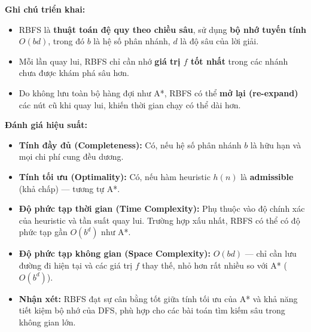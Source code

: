\textbf{Ghi chú triển khai:}
\begin{itemize}
    \item RBFS là \textbf{thuật toán đệ quy theo chiều sâu}, sử dụng \textbf{bộ nhớ tuyến tính $O(bd)$}, 
    trong đó $b$ là hệ số phân nhánh, $d$ là độ sâu của lời giải.
    \item Mỗi lần quay lui, RBFS chỉ cần nhớ \textbf{giá trị $f$ tốt nhất} trong các nhánh chưa được khám phá sâu hơn.
    \item Do không lưu toàn bộ hàng đợi như A*, RBFS có thể \textbf{mở lại (re-expand)} các nút cũ khi quay lui, 
    khiến thời gian chạy có thể dài hơn.
\end{itemize}

\textbf{Đánh giá hiệu suất:}
\begin{itemize}
    \item \textbf{Tính đầy đủ (Completeness):} Có, nếu hệ số phân nhánh $b$ là hữu hạn và mọi chi phí cung đều dương.
    \item \textbf{Tính tối ưu (Optimality):} Có, nếu hàm heuristic $h(n)$ là \textbf{admissible} (khả chấp) — tương tự A*.
    \item \textbf{Độ phức tạp thời gian (Time Complexity):} Phụ thuộc vào độ chính xác của heuristic và tần suất quay lui.  
    Trường hợp xấu nhất, RBFS có thể có độ phức tạp gần $O(b^d)$ như A*.
    \item \textbf{Độ phức tạp không gian (Space Complexity):} $O(bd)$ — chỉ cần lưu đường đi hiện tại và các giá trị $f$ thay thế, 
    nhỏ hơn rất nhiều so với A* ($O(b^d)$).
    \item \textbf{Nhận xét:} RBFS đạt sự cân bằng tốt giữa tính tối ưu của A* và khả năng tiết kiệm bộ nhớ của DFS, 
    phù hợp cho các bài toán tìm kiếm sâu trong không gian lớn.
\end{itemize}